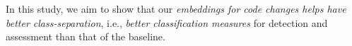 



In this study, we aim to show that our {\em embeddings for code
changes helps {\tool} have better class-separation}, i.e., {\em better
classification measures} for detection and assessment than that of the baseline.



